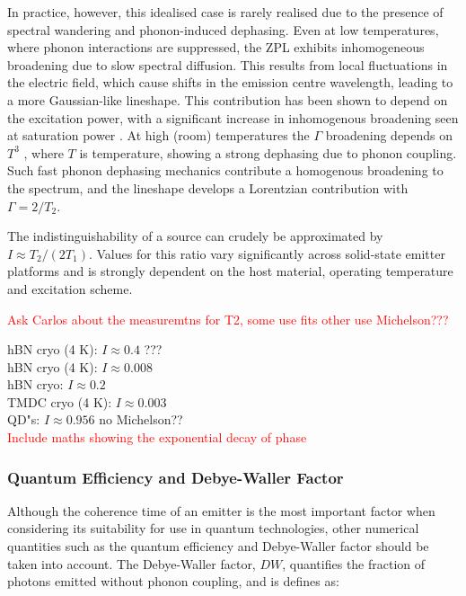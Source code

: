 In practice, however, this idealised case is rarely realised due to the presence of spectral wandering and phonon-induced dephasing. Even at low temperatures, where phonon interactions are suppressed, the ZPL exhibits inhomogeneous broadening due to slow spectral diffusion. This results from local fluctuations in the electric field, which cause shifts in the emission centre wavelength, leading to a more Gaussian-like lineshape. This contribution has been shown to depend on the excitation power, with a significant increase in inhomogenous broadening seen at saturation power \cite{White2021}. At high (room) temperatures the $\Gamma$ broadening depends on $T^3$ \cite{Sontheimer2017, White2021, Horder2022}, where $T$ is temperature, showing a strong dephasing due to phonon coupling. Such fast phonon dephasing mechanics contribute a homogenous broadening to the spectrum, and the lineshape develops a Lorentzian contribution with $\Gamma = 2/T_2$. 

The indistinguishability of a source can crudely be approximated by $I\approx T_2/(2T_1)$. Values for this ratio vary significantly across solid-state emitter platforms and is strongly dependent on the host material, operating temperature and excitation scheme.

\textcolor{red}{Ask Carlos about the measuremtns for T2, some use fits other use Michelson???}

hBN cryo (4 K): $I\approx 0.4$ \cite{Fournier2023}???\\
hBN cryo (4 K): $I\approx 0.008$ \cite{Sontheimer2017}\\
hBN cryo: $I\approx 0.2$ \cite{Horder2022} \\
TMDC cryo (4 K): $I\approx 0.003$ \cite{vonHelversen2023}\\
QD"s: $I\approx 0.956$ \cite{Ulhaq2010} no Michelson??\\

\textcolor{red}{Include maths showing the exponential decay of phase}

\subsubsection{Quantum Efficiency and Debye-Waller Factor}

Although the coherence time of an emitter is the most important factor when considering its suitability for use in quantum technologies, other numerical quantities such as the quantum efficiency and Debye-Waller factor should be taken into account. The Debye-Waller factor, $DW$, quantifies the fraction of photons emitted without phonon coupling, and is defines as:

